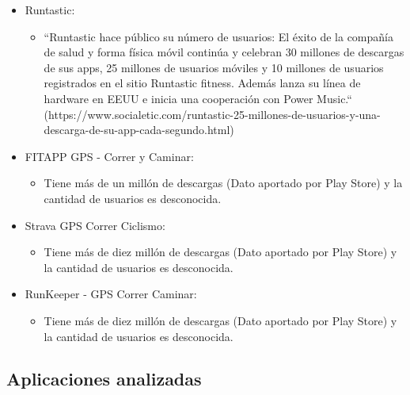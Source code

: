 \documentclass[a4paper, 11pt]{article}
\begin{document}
      \begin{itemize}
        \item{Runtastic:}
        \begin{itemize}
          \item{``Runtastic hace público su número de usuarios: El éxito de la
                 compañía de salud y forma física móvil continúa y celebran 30
                 millones de descargas de sus apps, 25 millones de usuarios
                 móviles y 10 millones de usuarios registrados en el sitio
                 Runtastic fitness. Además lanza su línea de hardware en EEUU e
                 inicia una cooperación con Power Music.`` (https://www.socialetic.com/runtastic-25-millones-de-usuarios-y-una-descarga-de-su-app-cada-segundo.html)}
        \end{itemize}
      \end{itemize}
      \begin{itemize}
        \item{FITAPP GPS - Correr y Caminar:}
        \begin{itemize}
          \item{Tiene más de un millón de descargas (Dato aportado por Play Store)
                y la cantidad de usuarios es desconocida.}
        \end{itemize}
      \end{itemize}
      \begin{itemize}
        \item{Strava GPS Correr Ciclismo:}
        \begin{itemize}
          \item{Tiene más de diez millón de descargas (Dato aportado por Play Store)
                y la cantidad de usuarios es desconocida.}
        \end{itemize}
      \end{itemize}
      \begin{itemize}
        \item{RunKeeper - GPS Correr Caminar:}
        \begin{itemize}
          \item{Tiene más de diez millón de descargas (Dato aportado por Play Store)
                y la cantidad de usuarios es desconocida.}
        \end{itemize}
      \end{itemize}

    \subsection{Aplicaciones analizadas}
\end{document}
